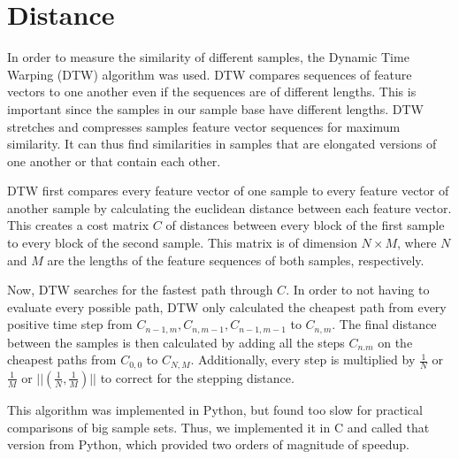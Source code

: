\section{Distance}
\label{sec:Distance}

In order to measure the similarity of different samples, the Dynamic Time Warping (DTW) algorithm was used. DTW compares sequences of feature vectors to one another even if the sequences are of different lengths. This is important since the samples in our sample base have different lengths. DTW stretches and compresses samples feature vector sequences for maximum similarity. It can thus find similarities in samples that are elongated versions of one another or that contain each other.

DTW first compares every feature vector of one sample to every feature vector of another sample by calculating the euclidean distance between each feature vector. This creates a cost matrix $C$ of distances between every block of the first sample to every block of the second sample. This matrix is of dimension $N \times M$, where $N$ and $M$ are the lengths of the feature sequences of both samples, respectively.

Now, DTW searches for the fastest path through $C$. In order to not having to evaluate every possible path, DTW only calculated the cheapest path from every positive time step from $C_{n-1,m}, C_{n,m-1}, C_{n-1,m-1}$ to $C_{n,m}$. The final distance between the samples is then calculated by adding all the steps $C_{n.m}$ on the cheapest paths from $C_{0,0}$ to $C_{N,M}$. Additionally, every step is multiplied by $\frac{1}{N}$ or $\frac{1}{M}$ or $||(\frac{1}{N},\frac{1}{M})||$ to correct for the stepping distance.

This algorithm was implemented in Python, but found too slow for practical comparisons of big sample sets. Thus, we implemented it in C and called that version from Python, which provided two orders of magnitude of speedup.
